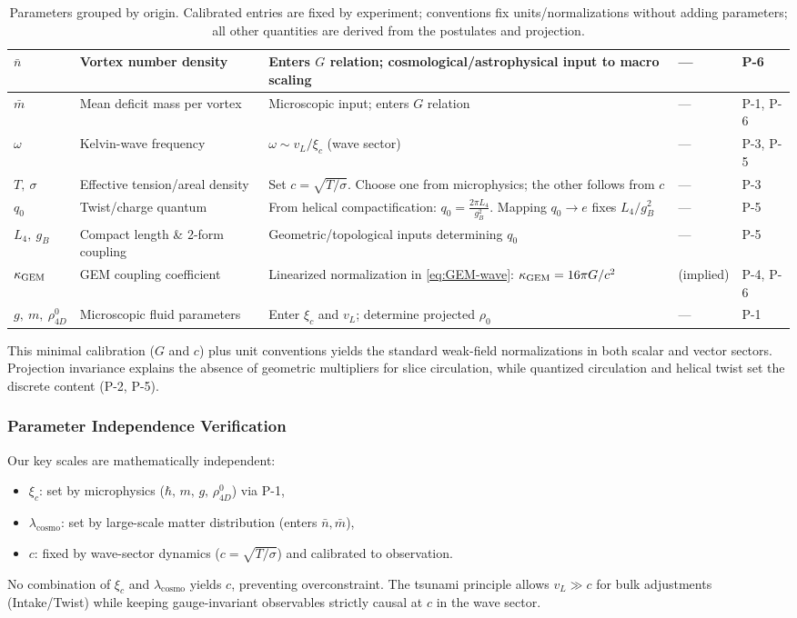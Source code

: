 \begin{table}[H]
\begin{tabularx}{\linewidth}{|p{1.7cm}|p{3.2cm}|X|p{2.4cm}|p{2.1cm}|}
\hline
$\bar n$ & Vortex number density & Enters $G$ relation; cosmological/astrophysical input to macro scaling & --- & P-6 \\
\hline
$\bar m$ & Mean deficit mass per vortex & Microscopic input; enters $G$ relation & --- & P-1, P-6 \\
\hline
$\omega$ & Kelvin-wave frequency & $\omega\sim v_L/\xi_c$ (wave sector) & --- & P-3, P-5 \\
\hline
$T,\ \sigma$ & Effective tension/areal density & Set $c=\sqrt{T/\sigma}$. Choose one from microphysics; the other follows from $c$ & --- & P-3 \\
\hline
$q_0$ & Twist/charge quantum & From helical compactification: $q_0=\frac{2\pi L_4}{g_B^2}$. Mapping $q_0\to e$ fixes $L_4/g_B^2$ & --- & P-5 \\
\hline
$L_4,\ g_B$ & Compact length \& 2-form coupling & Geometric/topological inputs determining $q_0$ & --- & P-5 \\
\hline
$\kappa_{\rm GEM}$ & GEM coupling coefficient & Linearized normalization in \eqref{eq:GEM-wave}: $\kappa_{\rm GEM}=16\pi G/c^{2}$ & (implied) & P-4, P-6 \\
\hline
$g,\ m,\ \rho_{4D}^0$ & Microscopic fluid parameters & Enter $\xi_c$ and $v_L$; determine projected $\rho_0$ & --- & P-1 \\
\hline
\end{tabularx}
\caption{Parameters grouped by origin. Calibrated entries are fixed by experiment; conventions fix units/normalizations without adding parameters; all other quantities are derived from the postulates and projection.}
\label{tab:parameters}
\end{table}

This minimal calibration ($G$ and $c$) plus unit conventions yields the standard weak-field normalizations in both scalar and vector sectors. Projection invariance explains the absence of geometric multipliers for slice circulation, while quantized circulation and helical twist set the discrete content (P-2, P-5).

\subsubsection{Parameter Independence Verification}

Our key scales are mathematically independent:
\begin{itemize}
\item $\xi_c$: set by microphysics ($\hbar,\,m,\,g,\,\rho_{4D}^0$) via P-1,
\item $\lambda_{\text{cosmo}}$: set by large-scale matter distribution (enters $\bar n,\bar m$),
\item $c$: fixed by wave-sector dynamics ($c=\sqrt{T/\sigma}$) and calibrated to observation.
\end{itemize}
No combination of $\xi_c$ and $\lambda_{\text{cosmo}}$ yields $c$, preventing overconstraint. The tsunami principle allows $v_L\gg c$ for bulk adjustments (Intake/Twist) while keeping gauge-invariant observables strictly causal at $c$ in the wave sector.

